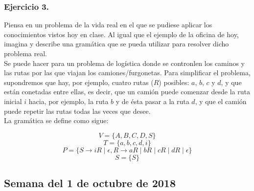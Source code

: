 \documentclass[11pt,a4paper]{article}
\begin{document}
\subsubsection{Ejercicio 3.} Piensa en un problema de la vida real en el que se pudiese aplicar los conocimientos vistos hoy en clase. Al igual que el ejemplo de la oficina de hoy, imagina y describe una gramática que se pueda utilizar para resolver dicho problema real.\\

Se puede hacer para un problema de logística donde se contronlen los caminos y las rutas por las que viajan los camiones/furgonetas. Para simplificar el problema, supondremos que hay, por ejemplo, cuatro rutas ($R$) posibles: $a$, $b$, $c$ y $d$, y que están conetadas entre ellas, es decir, que un camión puede comenzar desde la ruta inicial $i$ hacia, por ejemplo, la ruta $b$ y de ésta pasar a la ruta $d$, y que el camión puede repetir las rutas todas las veces que desee.\\

La gramática se define como sigue:

\[V=\{A,B,C,D,S\}\]
\[T=\{a,b,c,d,i\}\]
\[P=\{S\rightarrow iR\mid \epsilon,R\rightarrow aR\mid bR\mid cR\mid dR\mid \epsilon\}\]
\[S=\{S\}\]

\subsection{Semana del 1 de octubre de 2018}
\end{document}
